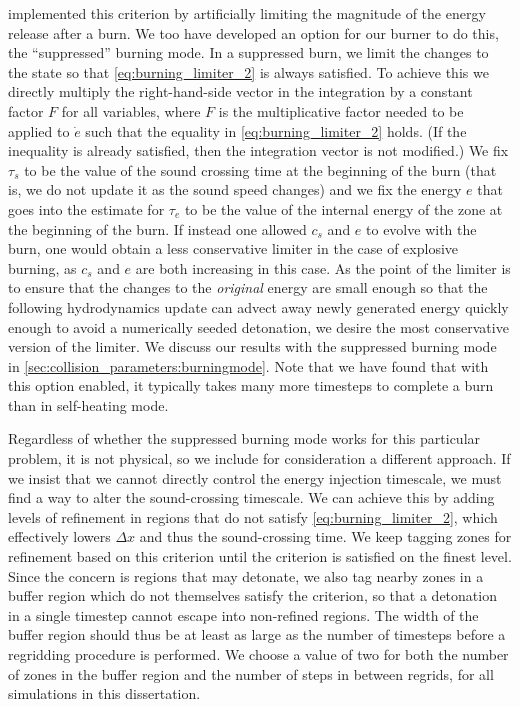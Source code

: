 \documentclass[12pt]{article}
\begin{document}
\citet{kushnir:2013} implemented this criterion by artificially 
limiting the magnitude of the energy release after a burn. We
too have developed an option for our burner to do this,
the ``suppressed'' burning mode. In a suppressed burn, we limit
the changes to the state so that \autoref{eq:burning_limiter_2}
is always satisfied. To achieve this we directly multiply the
right-hand-side vector in the integration by a constant factor $F$
for all variables, where $F$ is the multiplicative factor needed to
be applied to $\dot{e}$ such that the equality in \autoref{eq:burning_limiter_2}
holds. (If the inequality is already satisfied, then the integration
vector is not modified.) We fix $\tau_s$ to be the value of the sound
crossing time at the beginning of the burn (that is, we do not
update it as the sound speed changes) and we fix the energy $e$
that goes into the estimate for $\tau_e$ to be the value of the
internal energy of the zone at the beginning of the burn. If
instead one allowed $c_s$ and $e$ to evolve with the burn, one
would obtain a less conservative limiter in the case of explosive
burning, as $c_s$ and $e$ are both increasing in this case.
As the point of the limiter is to ensure that the changes to the
\textit{original} energy are small enough so that the following
hydrodynamics update can advect away newly generated energy
quickly enough to avoid a numerically seeded detonation,
we desire the most conservative version of the limiter. We discuss
our results with the suppressed burning mode in \autoref{sec:collision_parameters:burningmode}.
Note that we have found that with this option enabled, it typically takes
many more timesteps to complete a burn than in self-heating mode.

Regardless of whether the suppressed burning mode works for this
particular problem, it is not physical, so we include for
consideration a different approach. If we insist that we
cannot directly control the energy injection timescale, we 
must find a way to alter the sound-crossing timescale. 
We can achieve this by adding levels of refinement in 
regions that do not satisfy \autoref{eq:burning_limiter_2},
which effectively lowers $\Delta x$ and thus the
sound-crossing time. We keep tagging zones for refinement
based on this criterion until the criterion is satisfied
on the finest level. Since the concern is regions that 
may detonate, we also tag nearby zones in a buffer region
which do not themselves satisfy the criterion,
so that a detonation in a single timestep cannot 
escape into non-refined regions. The width of the buffer 
region should thus be at least as large as the number of 
timesteps before a regridding procedure is performed.
We choose a value of two for both the number of zones in the 
buffer region and the number of steps in between regrids,
for all simulations in this dissertation.
\end{document}
